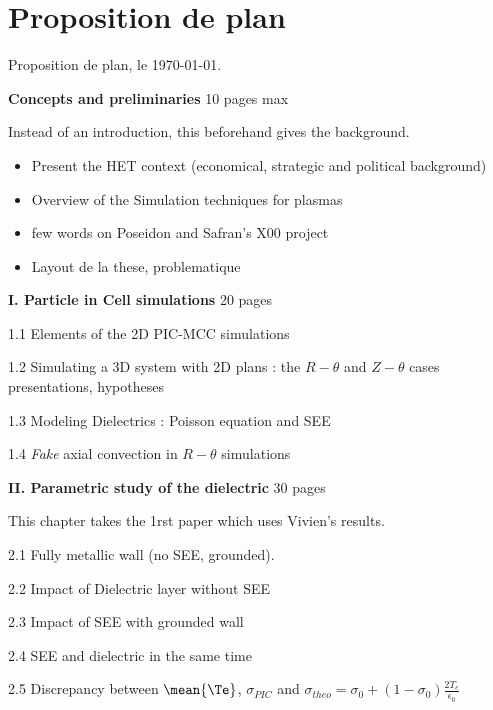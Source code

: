



\chapter*{Proposition de plan}

Proposition de plan, le \today.
\linebreak

{\bf Concepts and preliminaries} 10 pages max
\begin{zzz}
  Instead of an introduction, this beforehand gives the background.
  \begin{itemize}
    \item Present the HET context (economical, strategic and political background)
    \item Overview of the Simulation techniques for plasmas
    \item few words on {\sc Poseidon} and Safran's X00 project
    \item Layout de la these, problematique
  \end{itemize}
\end{zzz}

{\bf I. Particle in Cell simulations} 20 pages
\begin{zzz}
  1.1 Elements of the 2D PIC-MCC simulations

  1.2 Simulating a 3D system with 2D plans \string: the {\bf $R-\theta$} and {\bf $Z-\theta$} cases presentations, hypotheses

  1.3 Modeling Dielectrics \string: Poisson equation and SEE

  1.4 {\it Fake} axial convection in {\bf $R-\theta$} simulations
\end{zzz}

{\bf II. Parametric study of the dielectric} 30 pages
\begin{zzz}
  This chapter takes the 1rst paper which uses Vivien's results.

  2.1 Fully metallic wall (no SEE, grounded).

  2.2 Impact of Dielectric layer without SEE

  2.3 Impact of SEE with grounded wall

  2.4 SEE and dielectric in the same time

  2.5 Discrepancy between $\mean{\Te}$, $\sigma_{PIC}$ and $\sigma_{theo} = \sigma_0 + (1 - \sigma_0) \frac{2 T_e}{\epsilon_0}$
\end{zzz}

